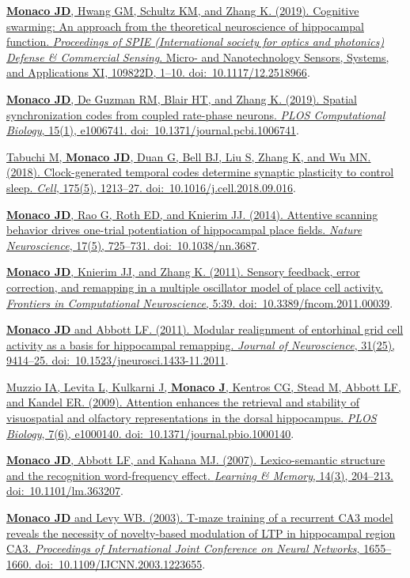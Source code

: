 \documentclass[10pt]{article}
\begin{document}
\begin{description}
\item \href{https://doi.org/10.1117/12.2518966}{\textbf{Monaco JD}, Hwang GM, Schultz KM, and Zhang K. (2019). Cognitive swarming: An approach from the theoretical neuroscience of hippocampal function. \emph{Proceedings of SPIE (International society for optics and photonics) Defense \& Commercial Sensing}. Micro- and Nanotechnology Sensors, Systems, and Applications XI, 109822D, 1--10. doi:~10.1117/12.2518966}.
\item \href{https://doi.org/10.1371/journal.pcbi.1006741}{\textbf{Monaco JD}, De Guzman RM, Blair HT, and Zhang K. (2019). Spatial synchronization codes from coupled rate-phase neurons. \emph{PLOS Computational Biology}, 15(1), e1006741. doi:~10.1371/journal.pcbi.1006741}.
\item \href{https://www.cell.com/cell/fulltext/S0092-8674(18)31228-5}{Tabuchi M, \textbf{Monaco JD}, Duan G, Bell BJ, Liu S, Zhang K, and Wu MN. (2018). Clock-generated temporal codes determine synaptic plasticity to control sleep. \emph{Cell}, 175(5), 1213--27. doi:~10.1016/j.cell.2018.09.016}.
\item \href{http://dx.doi.org/10.1038/nn.3687}{\textbf{Monaco JD}, Rao G, Roth ED, and Knierim JJ. (2014). Attentive scanning behavior drives one-trial potentiation of hippocampal place fields. \emph{Nature Neuroscience}, 17(5), 725--731. doi:~10.1038/nn.3687}.
\item \href{http://dx.doi.org/10.3389/fncom.2011.00039}{\textbf{Monaco JD}, Knierim JJ, and Zhang K. (2011). Sensory feedback, error correction, and remapping in a multiple oscillator model of place cell activity. \emph{Frontiers in Computational Neuroscience}, 5:39. doi:~10.3389/fncom.2011.00039}.
\item \href{http://dx.doi.org/10.1523/JNEUROSCI.1433-11.2011}{\textbf{Monaco JD} and Abbott LF. (2011). Modular realignment of entorhinal grid cell activity as a basis for hippocampal remapping. \emph{Journal of Neuroscience}, 31(25), 9414--25. doi:~10.1523/jneurosci.1433-11.2011}.
\item \href{http://dx.doi.org/10.1371/journal.pbio.1000140}{Muzzio IA, Levita L, Kulkarni J, \textbf{Monaco J}, Kentros CG, Stead M, Abbott LF, and Kandel ER. (2009). Attention enhances the retrieval and stability of visuospatial and olfactory representations in the dorsal hippocampus. \emph{PLOS Biology}, 7(6), e1000140. doi:~10.1371/journal.pbio.1000140}.
\item \href{http://dx.doi.org/10.1101/lm.363207}{\textbf{Monaco JD}, Abbott LF, and Kahana MJ. (2007). Lexico-semantic structure and the recognition word-frequency effect. \emph{Learning \& Memory}, 14(3), 204--213. doi:~10.1101/lm.363207}.
\item \href{http://dx.doi.org/10.1109/IJCNN.2003.1223655}{\textbf{Monaco JD} and Levy WB. (2003). T-maze training of a recurrent CA3 model reveals the necessity of novelty-based modulation of LTP in hippocampal region CA3. \emph{Proceedings of International Joint Conference on Neural Networks}, 1655--1660. doi:~10.1109/IJCNN.2003.1223655}.
\end{description}
\end{document}
